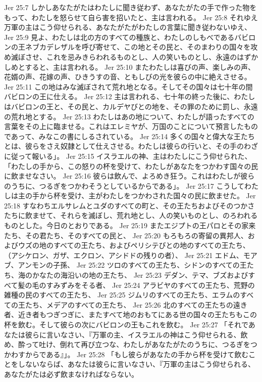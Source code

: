 Jer 25:7  しかしあなたがたはわたしに聞き従わず、あなたがたの手で作った物をもって、わたしを怒らせて自ら害を招いたと、主は言われる。
Jer 25:8  それゆえ万軍の主はこう仰せられる、あなたがたがわたしの言葉に聞き従わないゆえ、
Jer 25:9  見よ、わたしは北の方のすべての種族と、わたしのしもべであるバビロンの王ネブカデレザルを呼び寄せて、この地とその民と、そのまわりの国々を攻め滅ぼさせ、これを忌みきらわれるものとし、人の笑いものとし、永遠のはずかしめとすると、主は言われる。
Jer 25:10  またわたしは喜びの声、楽しみの声、花婿の声、花嫁の声、ひきうすの音、ともしびの光を彼らの中に絶えさせる。
Jer 25:11  この地はみな滅ぼされて荒れ地となる。そしてその国々は七十年の間バビロンの王に仕える。
Jer 25:12  主は言われる、七十年の終った後に、わたしはバビロンの王と、その民と、カルデヤびとの地を、その罪のために罰し、永遠の荒れ地とする。
Jer 25:13  わたしはあの地について、わたしが語ったすべての言葉をその上に臨ませる。これはエレミヤが、万国のことについて預言したものであって、みなこの書にしるされている。
Jer 25:14  多くの国々と偉大な王たちとは、彼らをさえ奴隷として仕えさせる。わたしは彼らの行いと、その手のわざに従って報いる」。
Jer 25:15  イスラエルの神、主はわたしにこう仰せられた、「わたしの手から、この怒りの杯を受けて、わたしがあなたをつかわす国々の民に飲ませなさい。
Jer 25:16  彼らは飲んで、よろめき狂う。これはわたしが彼らのうちに、つるぎをつかわそうとしているからである」。
Jer 25:17  こうしてわたしは主の手から杯を受け、主がわたしをつかわされた国々の民に飲ませた。
Jer 25:18  すなわちエルサレムとユダのすべての町と、その王たちおよびそのつかさたちに飲ませて、それらを滅ぼし、荒れ地とし、人の笑いものとし、のろわれるものとした。今日のとおりである。
Jer 25:19  またエジプトの王パロとその家来たち、その君たち、そのすべての民と、
Jer 25:20  もろもろの寄留の異邦人、およびウズの地のすべての王たち、およびペリシテびとの地のすべての王たち、（アシケロン、ガザ、エクロン、アシドドの残りの者）、
Jer 25:21  エドム、モアブ、アンモンの子孫、
Jer 25:22  ツロのすべての王たち、シドンのすべての王たち、海のかなたの海沿いの地の王たち、
Jer 25:23  デダン、テマ、ブズおよびすべて髪の毛のすみずみをそる者、
Jer 25:24  アラビヤのすべての王たち、荒野の雑種の民のすべての王たち、
Jer 25:25  ジムリのすべての王たち、エラムのすべての王たち、メデアのすべての王たち、
Jer 25:26  北のすべての王たちの遠き者、近き者もつぎつぎに、またすべて地のおもてにある世の国々の王たちもこの杯を飲む。そして彼らの次にバビロンの王もこれを飲む。
Jer 25:27  「それであなたは彼らに言いなさい、『万軍の主、イスラエルの神はこう仰せられる、飲め、酔って吐け、倒れて再び立つな、わたしがあなたがたのうちに、つるぎをつかわすからである』」。
Jer 25:28  「もし彼らがあなたの手から杯を受けて飲むことをしないならば、あなたは彼らに言いなさい、『万軍の主はこう仰せられる、あなたがたは必ず飲まなければならない。
